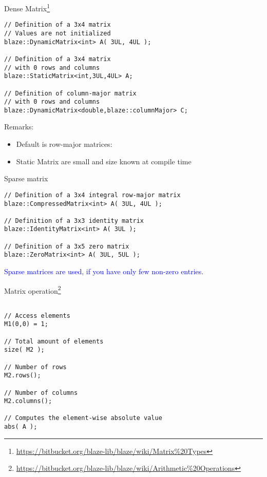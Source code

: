 \documentclass[\classoption]{beamer}
\begin{document}
\begin{frame}[fragile]{Dense Matrix\footnote{\tiny\url{https://bitbucket.org/blaze-lib/blaze/wiki/Matrix\%20Types}}}
\begin{lstlisting}
// Definition of a 3x4 matrix 
// Values are not initialized
blaze::DynamicMatrix<int> A( 3UL, 4UL );

// Definition of a 3x4 matrix
// with 0 rows and columns
blaze::StaticMatrix<int,3UL,4UL> A;

// Definition of column-major matrix
// with 0 rows and columns
blaze::DynamicMatrix<double,blaze::columnMajor> C;
\end{lstlisting}

\begin{block}{Remarks:}
\begin{itemize}
\item Default is row-major matrices:
\item Static Matrix are small and size known at compile time
\end{itemize}
\end{block}
\end{frame}


\begin{frame}[fragile]{Sparse matrix}
\begin{lstlisting}
// Definition of a 3x4 integral row-major matrix
blaze::CompressedMatrix<int> A( 3UL, 4UL );

// Definition of a 3x3 identity matrix
blaze::IdentityMatrix<int> A( 3UL );

// Definition of a 3x5 zero matrix
blaze::ZeroMatrix<int> A( 3UL, 5UL );
\end{lstlisting}

\begin{center}
\textcolor{blue}{Sparse matrices are used, if you have only few non-zero entries}.
\end{center}
\end{frame}

\begin{frame}[fragile]{Matrix operation\footnote{\tiny\url{https://bitbucket.org/blaze-lib/blaze/wiki/Arithmetic\%20Operations}}}
\begin{lstlisting}

// Access elements
M1(0,0) = 1;

// Total amount of elements
size( M2 );

// Number of rows
M2.rows(); 

// Number of columns
M2.columns(); 

// Computes the element-wise absolute value
abs( A );
\end{lstlisting}
\end{frame}
\end{document}

